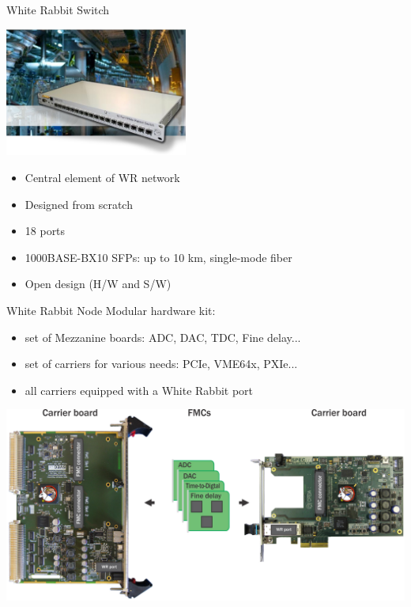 \documentclass[compress,red]{beamer}
\begin{document}
\begin{frame}{White Rabbit Switch }

    \begin{center}
    \includegraphics[width=6.0cm]{switch/wrSwitchV3.jpg}
    \end{center}

	\begin{itemize}
	\item Central element of WR network
	\item Designed from scratch
	\item 18 ports
	\item 1000BASE-BX10 SFPs: up to 10 km, single-mode fiber
	\item Open design (H/W and S/W)
	\end{itemize}
\end{frame}

\begin{frame}{White Rabbit Node}
  Modular hardware kit:
  \begin{itemize}
    \item set of Mezzanine boards: ADC, DAC, TDC, Fine delay...
    \item set of carriers for various needs: PCIe, VME64x, PXIe...
    \item all carriers equipped with a White Rabbit port
  \end{itemize}
  \begin{center}
  \includegraphics[height=0.5\textheight]{node/shw_kit2.png}
  \end{center}
\end{frame}
\end{document}
